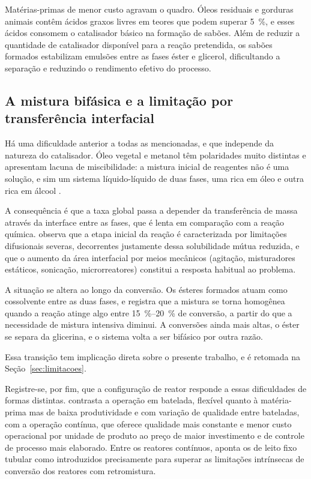 Matérias-primas de menor custo agravam o quadro. Óleos residuais e gorduras
animais contêm ácidos graxos livres em teores que podem superar
\SI{5}{\percent}, e esses ácidos consomem o catalisador básico na formação de
sabões. Além de reduzir a quantidade de catalisador disponível para a reação
pretendida, os sabões formados estabilizam emulsões entre as fases éster e
glicerol, dificultando a separação e reduzindo o rendimento efetivo do processo.


\subsection{A mistura bifásica e a limitação por transferência interfacial}
\label{sec:bifasico}

Há uma dificuldade anterior a todas as mencionadas, e que independe da natureza
do catalisador. Óleo vegetal e metanol têm polaridades muito distintas e
apresentam lacuna de miscibilidade: a mistura inicial de reagentes não é uma
solução, e sim um sistema líquido-líquido de duas fases, uma rica em óleo e
outra rica em álcool \cite{Muller2019}.

A consequência é que a taxa global passa a depender da transferência de massa
através da interface entre as fases, que é lenta em comparação com a reação
química. \textcite{Muller2019} observa que a etapa inicial da reação é
caracterizada por limitações difusionais severas, decorrentes justamente dessa
solubilidade mútua reduzida, e que o aumento da área interfacial por meios
mecânicos (agitação, misturadores estáticos, sonicação, microrreatores)
constitui a resposta habitual ao problema.

A situação se altera ao longo da conversão. Os ésteres formados atuam como
cossolvente entre as duas fases, e \textcite{Muller2019} registra que a mistura
se torna homogênea quando a reação atinge algo entre
\SIrange{15}{20}{\percent} de conversão, a partir do que a necessidade de mistura
intensiva diminui. A conversões ainda mais altas, o éster se separa da
glicerina, e o sistema volta a ser bifásico por outra razão.

Essa transição tem implicação direta sobre o presente trabalho, e é retomada na
Seção~\ref{sec:limitacoes}.

Registre-se, por fim, que a configuração de reator responde a essas
dificuldades de formas distintas. \textcite{Muller2019} contrasta a operação em
batelada, flexível quanto à matéria-prima mas de baixa produtividade e com
variação de qualidade entre bateladas, com a operação contínua, que oferece
qualidade mais constante e menor custo operacional por unidade de produto ao
preço de maior investimento e de controle de processo mais elaborado. Entre os
reatores contínuos, aponta os de leito fixo tubular como introduzidos
precisamente para superar as limitações intrínsecas de conversão dos reatores
com retromistura.

